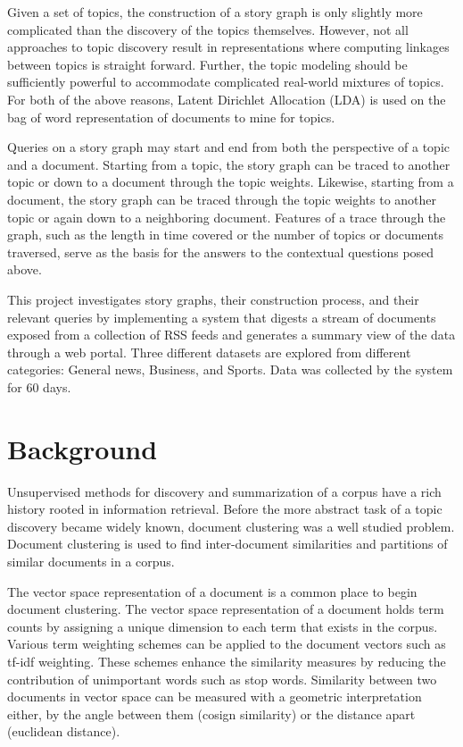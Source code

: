 \documentclass[10pt,twocolumn]{article}
\begin{document}
Given a set of topics, the construction of a story graph is only slightly more complicated than the discovery of the topics themselves.  However, not all approaches to topic discovery result in representations where computing linkages between topics is straight forward.  Further, the topic modeling should be sufficiently powerful to accommodate complicated real-world mixtures of topics.  For both of the above reasons, Latent Dirichlet Allocation (LDA) is used on the bag of word representation of documents to mine for topics. 

Queries on a story graph may start and end from both the perspective of a topic and a document.  Starting from a topic, the story graph can be traced to another topic or down to a document through the topic weights.  Likewise, starting from a document, the story graph can be traced through the topic weights to another topic or again down to a neighboring document.  Features of a trace through the graph, such as the length in time covered or the number of topics or documents traversed, serve as the basis for the answers to the contextual questions posed above.

This project investigates story graphs, their construction process, and their relevant queries by implementing a system that digests a stream of documents exposed from a collection of RSS feeds and generates a summary view of the data through a web portal.  Three different datasets are explored from different categories: General news, Business, and Sports.  Data was collected by the system for 60 days.

\section {Background}
Unsupervised methods for discovery and summarization of a corpus have a rich history rooted in information retrieval.  Before the more abstract task of a topic discovery became widely known, document clustering was a well studied problem.  Document clustering is used to find inter-document similarities and partitions of similar documents in a corpus.   

The vector space representation of a document is a common place to begin document clustering.  The vector space representation of a document holds term counts by assigning a unique dimension to each term that exists in the corpus.  Various term weighting schemes can be applied to the document vectors such as tf-idf weighting.  These schemes enhance the similarity measures by reducing the contribution of unimportant words such as stop words.  Similarity between two documents in vector space can be measured with a geometric interpretation either, by the angle between them (cosign similarity) or the distance apart (euclidean distance).
\end{document}

